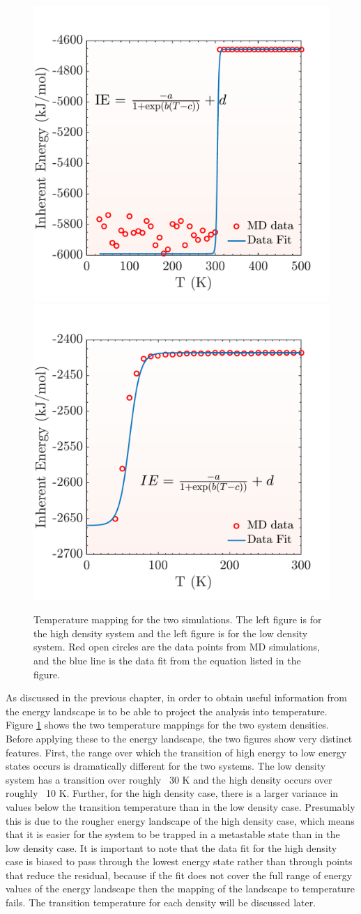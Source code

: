\begin{figure}[h]
	\centering
	\includegraphics[width = .45\textwidth]{./Figures/Nucleation/high_density/TemperatureMapping.pdf}
	\hspace{.03\textwidth}
	\includegraphics[width = .45\textwidth]{./Figures/Nucleation/low_density/TemperatureMapping.pdf}
	\caption{Temperature mapping for the two simulations.  The left figure is for the high density system and the left figure is for the low density system. Red open circles are the data points from MD simulations, and the blue line is the data fit from the equation listed in the figure.}
	\label{temperature}
\end{figure}

As discussed in the previous chapter, in order to obtain useful information from the energy landscape is to be able to project the analysis into temperature.  Figure \ref{temperature} shows the two temperature mappings for the two system densities.  Before applying these to the energy landscape, the two figures show very distinct features.  First, the range over which the transition of high energy to low energy states occurs is dramatically different for the two systems.  The low density system has a transition over roughly ~30 K and the high density occurs over roughly ~10 K.  Further, for the high density case, there is a larger variance in values below the transition temperature than in the low density case.  Presumably this is due to the rougher energy landscape of the high density case, which means that it is easier for the system to be trapped in a metastable state than in the low density  case.  It is important to note that the data fit for the high density case is biased to pass through the lowest energy state rather than through points that reduce the residual, because if the fit does not cover the full range of energy values of the energy landscape then the mapping of the landscape to temperature fails.  The transition temperature for each density will be discussed later.

